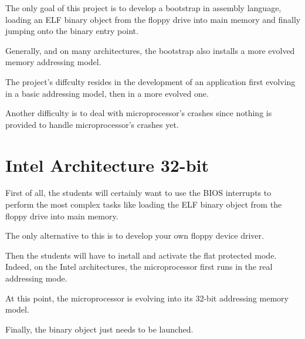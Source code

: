 The only  goal of this project is to develop a bootstrap in assembly language,
loading an ELF binary object from the floppy drive into main memory and
finally jumping onto the binary entry point.

Generally, and on many architectures, the bootstrap also installs
a more evolved memory addressing model.

The project's diffculty resides in the development of an
application first evolving in a basic addressing model, then in
a more evolved one.

Another difficulty is to deal with microprocessor's crashes since
nothing is provided to handle microprocessor's crashes yet.

%
%

\section{Intel Architecture 32-bit}

First of all, the students will certainly want to use the BIOS interrupts
to perform the most complex tasks like loading the ELF binary object
from the floppy drive into main memory.

The only alternative to this is to develop your own floppy device driver.

Then the students will have to install and activate the flat protected mode.
Indeed, on the Intel architectures, the microprocessor first runs in
the real addressing mode.

At this point, the microprocessor is evolving into its 32-bit addressing
memory model.

Finally, the binary object just needs to be launched.
